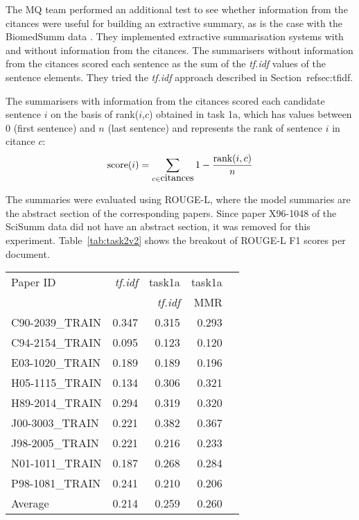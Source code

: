 \documentclass[11pt]{article}
\begin{document}
The MQ team performed an additional test to see  whether information from 
the citances were useful for building an extractive summary, as is the 
case with the BiomedSumm data \cite{Molla:ALTA2014}. They implemented 
extractive summarisation systems with and without information from the 
citances. 
The summarisers without information from the citances scored each sentence 
as the sum of the \emph{tf.idf} values of the sentence elements. They tried 
the \emph{tf.idf} approach described in Section~ref{sec:tfidf}.

The summarisers with information from the citances scored each candidate 
sentence $i$ on the basis of rank($i$,$c$) obtained in task 1a, which has 
values between 0 (first sentence) and $n$ (last sentence) and represents 
the rank of sentence $i$ in citance $c$:
$$
\hbox{score}(i) = \sum_{c\in\hbox{citances}}1-\frac{\hbox{rank}(i,c)}{n}
$$

The summaries were evaluated using ROUGE-L, where the model summaries are 
the abstract section of the corresponding papers. Since paper X96-1048 of 
the SciSumm data did not have an abstract section, it was removed for this 
experiment.
Table~\ref{tab:task2v2} shows the breakout of ROUGE-L F1 scores per document.

\begin{table*}
  \centering
  \begin{tabular}{|l|r|r|r|r|}
  \hline
	Paper ID & \emph{tf.idf} & task1a  & task1a \\
			&	&	\emph{tf.idf}		& MMR \\
	\hline
	C90-2039\_TRAIN & 0.347 & 0.315 & 0.293\\
	C94-2154\_TRAIN & 0.095 & 0.123 & 0.120\\
	E03-1020\_TRAIN & 0.189 & 0.189 & 0.196\\
	H05-1115\_TRAIN & 0.134 & 0.306 & 0.321\\
	H89-2014\_TRAIN & 0.294 & 0.319 & 0.320\\
	J00-3003\_TRAIN & 0.221 & 0.382 & 0.367\\
	J98-2005\_TRAIN & 0.221 & 0.216 & 0.233\\
	N01-1011\_TRAIN & 0.187 & 0.268 & 0.284\\
	P98-1081\_TRAIN & 0.241 & 0.210 & 0.206\\
	\hline
	Average & 0.214 & 0.259 & 0.260 \\
	\hline
  \end{tabular}
  \caption{ROUGE-L F1 results for summaries generated by the MQ system}
  \label{tab:task2v2}
\end{table*}
\end{document}
